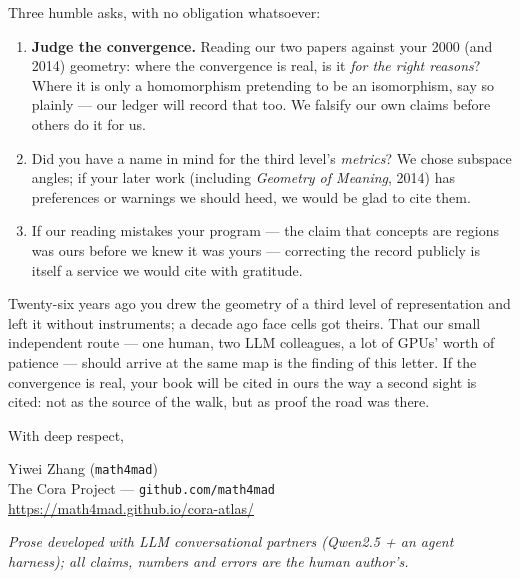 \documentclass[11pt, a4paper]{article}
\begin{document}
Three humble asks, with no obligation whatsoever:
\begin{enumerate}
  \item \textbf{Judge the convergence.} Reading our two papers against your 2000 (and 2014) geometry: where the convergence is real, is it \textit{for the right reasons}? Where it is only a homomorphism pretending to be an isomorphism, say so plainly --- our ledger will record that too. We falsify our own claims before others do it for us.
  \item Did you have a name in mind for the third level's \textit{metrics}? We chose subspace angles; if your later work (including \textit{Geometry of Meaning}, 2014) has preferences or warnings we should heed, we would be glad to cite them.
  \item If our reading mistakes your program --- the claim that concepts are regions was ours before we knew it was yours --- correcting the record publicly is itself a service we would cite with gratitude.
\end{enumerate}

Twenty-six years ago you drew the geometry of a third level of representation and left it without instruments; a decade ago face cells got theirs. That our small independent route --- one human, two LLM colleagues, a lot of GPUs' worth of patience --- should arrive at the same map is the finding of this letter. If the convergence is real, your book will be cited in ours the way a second sight is cited: not as the source of the walk, but as proof the road was there.

With deep respect,

Yiwei Zhang (\texttt{math4mad})\\
The Cora Project --- \texttt{github.com/math4mad}\\
\url{https://math4mad.github.io/cora-atlas/}

\smallskip
\small{\textit{Prose developed with LLM conversational partners (Qwen2.5 + an agent harness); all claims, numbers and errors are the human author's.}}
\end{document}
